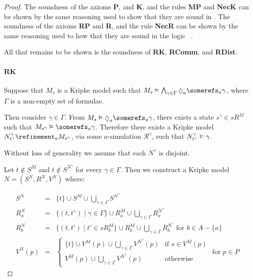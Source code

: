 \begin{proof}
The soundness of the axioms {\bf P}, and {\bf K}, and the rules {\bf MP} and
{\bf NecK} can be shown by the same reasoning used to show that they are sound
in \logicK{}. The soundness of the axioms {\bf RP} and {\bf R}, and the rule
{\bf NecR} can be shown by the same reasoning used to how that they are sound in
the logic \logicKiF{}~\cite{french2010future}.

All that remains to be shown is the soundness of {\bf RK}, {\bf RComm}, and {\bf
RDist}.

\paragraph{RK}
Suppose that $M_s$ is a Kripke model such that $M_s \entails \bigwedge_{\gamma
\in \Gamma} \suspects_a \somerefs_a \gamma$, where $\Gamma$ is a non-empty set
of formulae.

Then consider $\gamma \in \Gamma$. From $M_s \entails \suspects_a \somerefs_a
\gamma$, there exists a state $s^\gamma \in sR^M$ such that $M_{s^\gamma}
\entails \somerefs_a \gamma$. Therefore there exists a Kripke model
$N^\gamma_{t^\gamma} \refinement_a M_{s^\gamma}$, via some $a$-simulation
$\mathcal{R}^\gamma$, such that $N^\gamma_{t^\gamma} \vDash \gamma$.

Without loss of generality we assume that each $N^\gamma$ is disjoint.

Let $t \notin S^M$ and $t \notin S^{N^\gamma}$ for every $\gamma \in \Gamma$.
Then we construct a Kripke model $N = (S^N, R^N, V^N)$ where:

\begin{eqnarray*}
S^N &=& \{t\} \cup S^M \cup \bigcup_{\gamma \in \Gamma} S^{N^\gamma}\\
R^N_a &=& \{(t, t^\gamma) \mid \gamma \in \Gamma\}
\cup R^M_a
\cup \bigcup_{\gamma \in \Gamma} R^{N^\gamma}_a\\
R^N_b &=& \{(t, t') \mid t' \in sR^M_b\}
\cup R^M_b
\cup \bigcup_{\gamma \in \Gamma} R^{N^\gamma}_b \text{ for $b \in A - \{a\}$}\\
V^N(p) &=& 
\begin{cases}
\{t\} \cup V^M(p) \cup \bigcup_{\gamma \in \Gamma} V^{N^\gamma}(p) & \text{if $s
\in V^M(p)$}\\
V^M(p) \cup \bigcup_{\gamma \in \Gamma} V^{N^\gamma}(p) & \text{otherwise}
\end{cases}
\text{ for $p \in P$}
\end{eqnarray*}


\end{proof}
